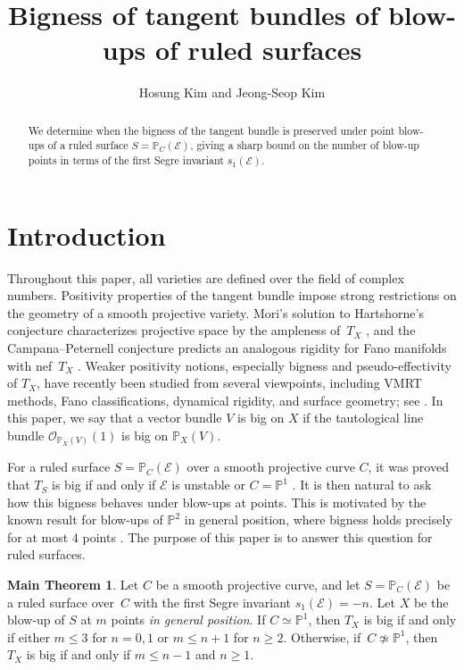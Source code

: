 \documentclass[reqno]{amsart}
\title{Bigness of tangent bundles of blow-ups of ruled surfaces}
\author{Hosung Kim and Jeong-Seop Kim}
\theoremstyle{definition}
\newtheorem*{Main}{Main Theorem}
\newcommand{\PP}{\mathbb{P}}
\newcommand{\Ee}{\mathcal{E}}
\newcommand{\Oo}{\mathcal{O}}
\newcommand{\tS}{X}
\begin{document}
\maketitle

\begin{abstract}
We determine when the bigness of the tangent bundle is preserved under point blow-ups of a ruled surface $S=\PP_C(\Ee)$, giving a sharp bound on the number of blow-up points in terms of the first Segre invariant $s_1(\Ee)$.
\end{abstract}


\section{Introduction}

Throughout this paper, all varieties are defined over the field of complex numbers.
Positivity properties of the tangent bundle impose strong restrictions on the geometry of a smooth projective variety.
Mori's solution to Hartshorne's conjecture characterizes projective space by the ampleness of~$T_X$ \cite{Mor79}, and the Campana--Peternell conjecture predicts an analogous rigidity for Fano manifolds with nef~$T_X$ \cite{CP91}.
Weaker positivity notions, especially bigness and pseudo-effectivity of $T_X$, have recently been studied from several viewpoints, including VMRT methods, Fano classifications, dynamical rigidity, and surface geometry; see \cite{Hsi15,Mal21,HLS22,HL23,SZ25,JLZ25,KKL25,KKL24}.
In this paper, we say that a vector bundle $V$ is big on $X$ if the tautological line bundle $\Oo_{\PP_X(V)}(1)$ is big on $\PP_X(V)$.


For a ruled surface $S=\PP_C(\Ee)$ over a smooth projective curve $C$, it was proved that $T_S$ is big if and only if $\Ee$ is unstable or $C=\PP^1$ \cite{Kim23}.
It is then natural to ask how this bigness behaves under blow-ups at points.
This is motivated by the known result for blow-ups of $\PP^2$ in general position, where bigness holds precisely for at most $4$ points \cite{HLS22}.
The purpose of this paper is to answer this question for ruled surfaces.

\begin{Main}
Let $C$ be a smooth projective curve, and let $S=\PP_C(\Ee)$ be a ruled surface over~$C$ with the first Segre invariant $s_1(\Ee)=-n$.
Let $\tS$ be the blow-up of $S$ at $m$ points \emph{in general position}.
If $C\simeq \PP^1$, then $T_{\tS}$ is big if and only if either $m\leq 3$ for $n=0,1$ or $m\leq n+1$ for $n\geq 2$.
Otherwise, if~$C\not\simeq\PP^1$, then $T_{\tS}$ is big if and only if $m\leq n-1$ and $n\geq 1$.
\end{Main}
\end{document}

